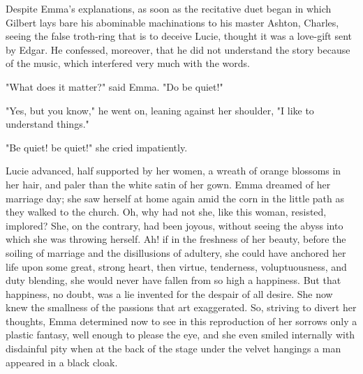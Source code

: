 \documentclass[11pt,twocolumn]{ltugboat}
\begin{document}
Despite Emma's explanations, as soon as the recitative duet began
in which Gilbert lays bare his abominable machinations to his master
Ashton, Charles, seeing the false troth-ring that is to deceive Lucie,
thought it was a love-gift sent by Edgar. He confessed, moreover, that
he did not understand the story because of the music, which interfered
very much with the words.

"What does it matter?" said Emma. "Do be quiet!"

"Yes, but you know," he went on, leaning against her shoulder, "I like
to understand things."

"Be quiet! be quiet!" she cried impatiently.

Lucie advanced, half supported by her women, a wreath of orange blossoms
in her hair, and paler than the white satin of her gown. Emma dreamed
of her marriage day; she saw herself at home again amid the corn in the
little path as they walked to the church. Oh, why had not she, like
this woman, resisted, implored? She, on the contrary, had been joyous,
without seeing the abyss into which she was throwing herself. Ah! if
in the freshness of her beauty, before the soiling of marriage and the
disillusions of adultery, she could have anchored her life upon some
great, strong heart, then virtue, tenderness, voluptuousness, and duty
blending, she would never have fallen from so high a happiness. But that
happiness, no doubt, was a lie invented for the despair of all desire.
She now knew the smallness of the passions that art exaggerated. So,
striving to divert her thoughts, Emma determined now to see in this
reproduction of her sorrows only a plastic fantasy, well enough to
please the eye, and she even smiled internally with disdainful pity when
at the back of the stage under the velvet hangings a man appeared in a
black cloak.
\end{document}
